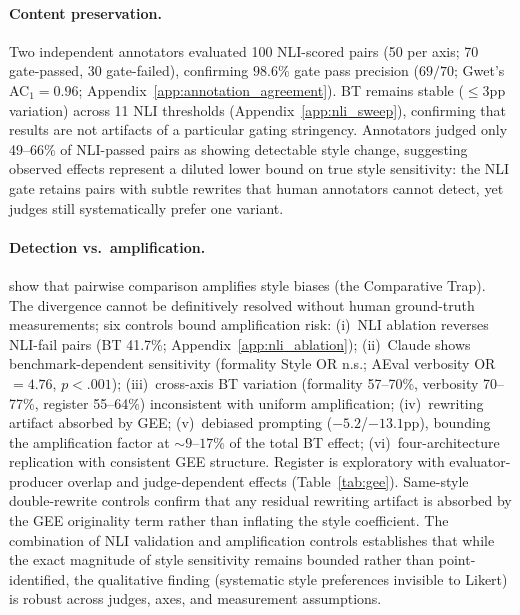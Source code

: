 \paragraph{Content preservation.}
Two independent annotators evaluated 100 NLI-scored pairs (50 per axis; 70 gate-passed, 30 gate-failed), confirming $98.6\%$ gate pass precision ($69/70$; Gwet's AC$_1 = 0.96$; Appendix~\ref{app:annotation_agreement}).
\label{sec:nli_threshold}
BT remains stable (${\leq}3$pp variation) across 11 NLI thresholds (Appendix~\ref{app:nli_sweep}), confirming that results are not artifacts of a particular gating stringency.
Annotators judged only 49--66\% of NLI-passed pairs as showing detectable style change, suggesting observed effects represent a diluted lower bound on true style sensitivity: the NLI gate retains pairs with subtle rewrites that human annotators cannot detect, yet judges still systematically prefer one variant.

\paragraph{Detection vs.\ amplification.}
\label{sec:amplification}
\citet{jeong2025comparative} show that pairwise comparison amplifies style biases (the Comparative Trap).
The divergence cannot be definitively resolved without human ground-truth measurements; six controls bound amplification risk: (i)~NLI ablation reverses NLI-fail pairs (BT 41.7\%; Appendix~\ref{app:nli_ablation}); (ii)~Claude shows benchmark-dependent sensitivity (formality Style OR n.s.; AEval verbosity OR $= 4.76$, $p < .001$); (iii)~cross-axis BT variation (formality 57--70\%, verbosity 70--77\%, register 55--64\%) inconsistent with uniform amplification; (iv)~rewriting artifact absorbed by GEE; (v)~debiased prompting ($-5.2$/$-13.1$pp), bounding the amplification factor at ${\sim}9$--$17\%$ of the total BT effect; (vi)~four-architecture replication with consistent GEE structure.
Register is exploratory with evaluator-producer overlap and judge-dependent effects (Table~\ref{tab:gee}).
Same-style double-rewrite controls confirm that any residual rewriting artifact is absorbed by the GEE originality term rather than inflating the style coefficient.
The combination of NLI validation and amplification controls establishes that while the exact magnitude of style sensitivity remains bounded rather than point-identified, the qualitative finding (systematic style preferences invisible to Likert) is robust across judges, axes, and measurement assumptions.
